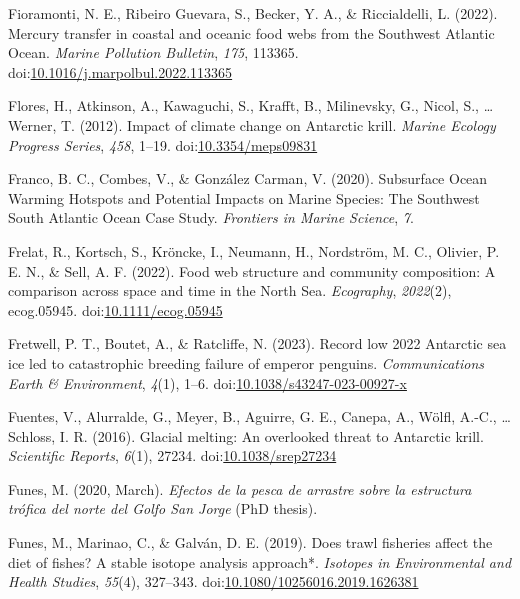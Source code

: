 \documentclass[
]{article}
\newlength{\cslhangindent}
\newlength{\cslentryspacingunit} %
\newenvironment{CSLReferences}[2] %
 {%
  \setlength{\parindent}{0pt}
  \ifodd #1
  \let\oldpar\par
  \def\par{\hangindent=\cslhangindent\oldpar}
  \fi
  \setlength{\parskip}{#2\cslentryspacingunit}
 }%
 {}
\begin{document}
\begin{CSLReferences}{1}{0}
\leavevmode{}%
Fioramonti, N. E., Ribeiro Guevara, S., Becker, Y. A., \& Riccialdelli,
L. (2022). Mercury transfer in coastal and oceanic food webs from the
{Southwest Atlantic Ocean}. \emph{Marine Pollution Bulletin},
\emph{175}, 113365.
doi:\href{https://doi.org/10.1016/j.marpolbul.2022.113365}{10.1016/j.marpolbul.2022.113365}

\leavevmode{}%
Flores, H., Atkinson, A., Kawaguchi, S., Krafft, B., Milinevsky, G.,
Nicol, S., \ldots{} Werner, T. (2012). Impact of climate change on
{Antarctic} krill. \emph{Marine Ecology Progress Series}, \emph{458},
1--19. doi:\href{https://doi.org/10.3354/meps09831}{10.3354/meps09831}

\leavevmode{}%
Franco, B. C., Combes, V., \& González Carman, V. (2020). Subsurface
{Ocean Warming Hotspots} and {Potential Impacts} on {Marine Species}:
{The Southwest South Atlantic Ocean Case Study}. \emph{Frontiers in
Marine Science}, \emph{7}.

\leavevmode{}%
Frelat, R., Kortsch, S., Kröncke, I., Neumann, H., Nordström, M. C.,
Olivier, P. E. N., \& Sell, A. F. (2022). Food web structure and
community composition: A comparison across space and time in the {North
Sea}. \emph{Ecography}, \emph{2022}(2), ecog.05945.
doi:\href{https://doi.org/10.1111/ecog.05945}{10.1111/ecog.05945}

\leavevmode{}%
Fretwell, P. T., Boutet, A., \& Ratcliffe, N. (2023). Record low 2022
{Antarctic} sea ice led to catastrophic breeding failure of emperor
penguins. \emph{Communications Earth \& Environment}, \emph{4}(1), 1--6.
doi:\href{https://doi.org/10.1038/s43247-023-00927-x}{10.1038/s43247-023-00927-x}

\leavevmode{}%
Fuentes, V., Alurralde, G., Meyer, B., Aguirre, G. E., Canepa, A.,
Wölfl, A.-C., \ldots{} Schloss, I. R. (2016). Glacial melting: An
overlooked threat to {Antarctic} krill. \emph{Scientific Reports},
\emph{6}(1), 27234.
doi:\href{https://doi.org/10.1038/srep27234}{10.1038/srep27234}

\leavevmode{}%
Funes, M. (2020, March). \emph{Efectos de la pesca de arrastre sobre la
estructura trófica del norte del {Golfo San Jorge}} (PhD thesis).

\leavevmode{}%
Funes, M., Marinao, C., \& Galván, D. E. (2019). Does trawl fisheries
affect the diet of fishes? {A} stable isotope analysis approach*.
\emph{Isotopes in Environmental and Health Studies}, \emph{55}(4),
327--343.
doi:\href{https://doi.org/10.1080/10256016.2019.1626381}{10.1080/10256016.2019.1626381}


\end{CSLReferences}
\end{document}
